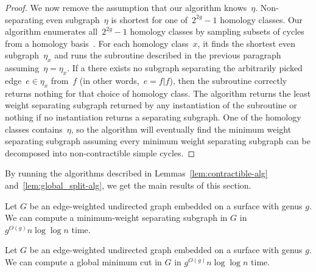 \begin{proof}
We now remove the assumption that our algorithm knows~$\eta$. Non-separating even subgraph~$\eta$ is shortest for one of~$2^{2g}-1$ homology classes. Our algorithm enumerates all~$2^{2g}-1$ homology classes by sampling subsets of cycles from a homology basis~\cite{e-dgteg-03}. For each homology class~$x$, it finds the shortest even subgraph~$\eta_x$ and runs the subroutine described in the previous paragraph assuming~$\eta = \eta_x$. If a there exists no subgraph separating the arbitrarily picked edge~$e \in \eta_x$ from~$f$ (in other words,~$e = f | f$), then the subroutine correctly returns nothing for that choice of homology class.
The algorithm returns the least weight separating subgraph returned by any instantiation of the subroutine or nothing if no instantiation returns a separating subgraph.
One of the homology classes contains~$\eta$, so the algorithm will eventually find the minimum weight separating subgraph assuming every minimum weight separating subgraph can be decomposed into non-contractible simple cycles.
\end{proof}

By running the algorithms described in Lemmas~\ref{lem:contractible-alg} and~\ref{lem:global_split-alg}, we get the main results of this section.

\begin{theorem}
Let $G$ be an edge-weighted undirected graph embedded on a surface with genus $g$.
We can compute a minimum-weight separating subgraph in $G$ in $g^{O(g)} n \log \log n$ time.
\end{theorem}

\begin{corollary}
Let $G$ be an edge-weighted undirected graph embedded on a surface with genus $g$.
We can compute a global minimum cut in $G$ in $g^{O(g)} n \log \log n$ time.
\end{corollary}
